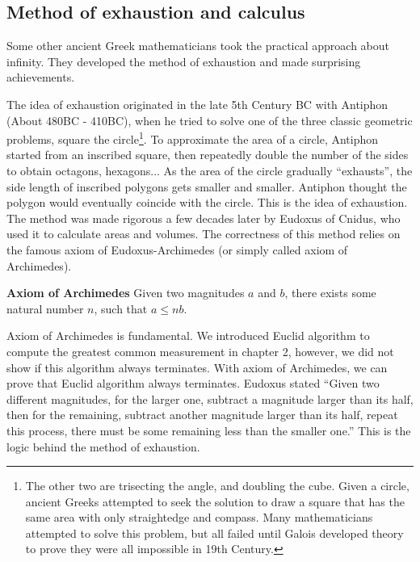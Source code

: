 \documentclass{article}
\begin{document}
\subsection{Method of exhaustion and calculus}

Some other ancient Greek mathematicians took the practical approach about infinity. They developed the method of exhaustion and made surprising achievements.

The idea of exhaustion originated in the late 5th Century BC with Antiphon (About 480BC - 410BC), when he tried to solve one of the three classic geometric problems, square the circle\footnote{The other two are trisecting the angle, and doubling the cube. Given a circle, ancient Greeks attempted to seek the solution to draw a square that has the same area with only straightedge and compass. Many mathematicians attempted to solve this problem, but all failed until Galois developed theory to prove they were all impossible in 19th Century.}. To approximate the area of a circle, Antiphon started from an inscribed square, then repeatedly double the number of the sides to obtain octagons, hexagons... As the area of the circle gradually ``exhausts'', the side length of inscribed polygons gets smaller and smaller. Antiphon thought the polygon would eventually coincide with the circle. This is the idea of exhaustion. The method was made rigorous a few decades later by Eudoxus of Cnidus, who used it to calculate areas and volumes. The correctness of this method relies on the famous axiom of Eudoxus-Archimedes (or simply called axiom of Archimedes).

\begin{axiom}
\normalfont
\textbf{Axiom of Archimedes} Given two magnitudes $a$ and $b$, there exists some natural number $n$, such that $a \leq nb$.
\end{axiom}

Axiom of Archimedes is fundamental. We introduced Euclid algorithm to compute the greatest common measurement in chapter 2, however, we did not show if this algorithm always terminates. With axiom of Archimedes, we can prove that Euclid algorithm always terminates. Eudoxus stated ``Given two different magnitudes, for the larger one, subtract a magnitude larger than its half, then for the remaining, subtract another magnitude larger than its half, repeat this process, there must be some remaining less than the smaller one.'' This is the logic behind the method of exhaustion.
\end{document}
